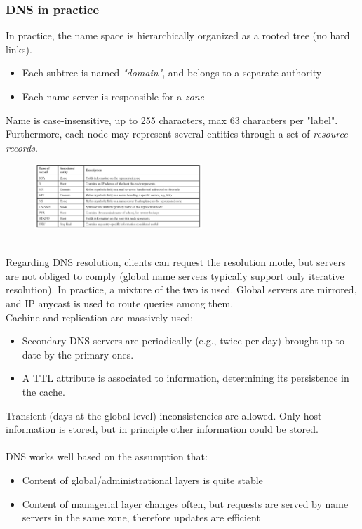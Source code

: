 \documentclass[10pt,a4paper]{article}
\begin{document}
\subsubsection{DNS in practice}
In practice, the name space is hierarchically organized as a rooted tree (no hard links).
\begin{itemize}
	\item Each subtree is named \textit{"domain"}, and belongs to a separate authority
	\item Each name server is responsible for a \textit{zone}
\end{itemize}
Name is case-insensitive, up to 255 characters, max 63 characters per "label". Furthermore, each node may represent several entities through a set of \textit{resource records}.
\begin{figure}[h!]
 \hfill \includegraphics[width=180pt]{images/dns-struct.png}\hspace*{\fill}
  \label{fig:dns-struct}
\end{figure} \\
Regarding DNS resolution, clients can request the resolution mode, but servers are not obliged to comply (global name servers typically support only iterative resolution). In practice, a mixture of the two is used. Global servers are mirrored, and IP anycast is used to route queries among them. \\ 
Cachine and replication are massively used: 
\begin{itemize}
	\item Secondary DNS servers are periodically (e.g., twice per day) brought up-to-date by the primary ones.
	\item A TTL attribute is associated to information, determining its persistence in the cache.
\end{itemize}
Transient (days at the global level) inconsistencies are allowed. Only host information is stored, but in principle other information could be stored. \\ \\
DNS works well based on the assumption that:
\begin{itemize}
	\item Content of global/administrational layers is quite stable
	\item Content of managerial layer changes often, but requests are served by name servers in the same zone, therefore updates are efficient
\end{itemize}
\end{document}
